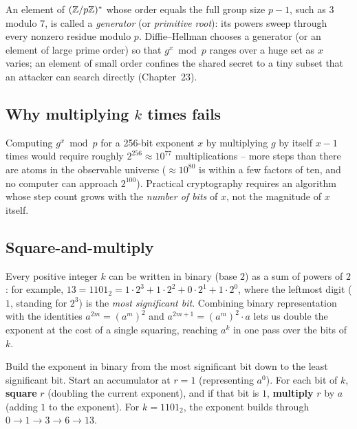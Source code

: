 An element of $(\mathbb{Z}/p\mathbb{Z})^{*}$ whose order equals the full group size $p - 1$, such as $3$ modulo $7$, is called a \emph{generator} (or \emph{primitive root}): its powers sweep through every nonzero residue modulo $p$. Diffie--Hellman chooses a generator (or an element of large prime order) so that $g^x \bmod p$ ranges over a huge set as $x$ varies; an element of small order confines the shared secret to a tiny subset that an attacker can search directly (Chapter~23).

\subsection{Why multiplying \texorpdfstring{$k$}{k} times fails}

Computing $g^x \bmod p$ for a 256-bit exponent $x$ by multiplying $g$ by itself $x - 1$ times would require roughly $2^{256} \approx 10^{77}$ multiplications -- more steps than there are atoms in the observable universe ($\approx 10^{80}$ is within a few factors of ten, and no computer can approach $2^{100}$). Practical cryptography requires an algorithm whose step count grows with the \emph{number of bits} of $x$, not the magnitude of $x$ itself.

\subsection{Square-and-multiply}

Every positive integer $k$ can be written in binary (base $2$) as a sum of powers of $2$: for example, $13 = 1101_2 = 1\cdot 2^3 + 1\cdot 2^2 + 0\cdot 2^1 + 1\cdot 2^0$, where the leftmost digit ($1$, standing for $2^3$) is the \emph{most significant bit}. Combining binary representation with the identities $a^{2m} = (a^m)^2$ and $a^{2m+1} = (a^m)^2 \cdot a$ lets us double the exponent at the cost of a single squaring, reaching $a^k$ in one pass over the bits of $k$.

\begin{intuitionbox}
Build the exponent in binary from the most significant bit down to the least significant bit. Start an accumulator at $r = 1$ (representing $a^0$). For each bit of $k$, \textbf{square} $r$ (doubling the current exponent), and if that bit is $1$, \textbf{multiply} $r$ by $a$ (adding $1$ to the exponent). For $k = 1101_2$, the exponent builds through $0 \to 1 \to 3 \to 6 \to 13$.
\end{intuitionbox}

